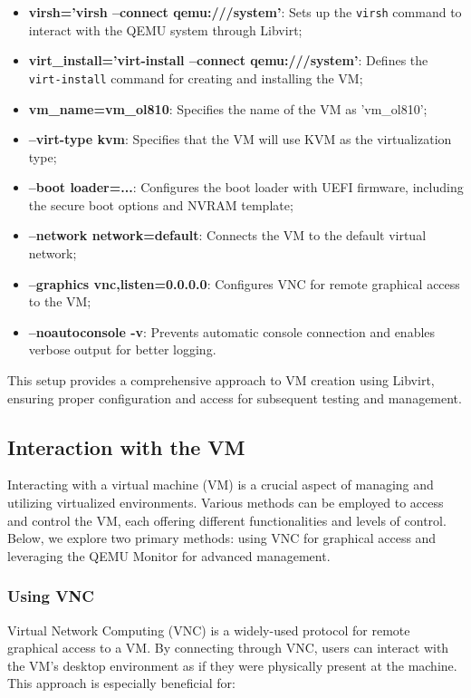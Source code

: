 \begin{itemize}
    \item \textbf{virsh='virsh --connect qemu:///system'}: Sets up the \texttt{virsh} command to interact with the QEMU system through Libvirt;
    \item \textbf{virt\_install='virt-install --connect qemu:///system'}: Defines the \texttt{virt-install} command for creating and installing the VM;
    \item \textbf{vm\_name=vm\_ol810}: Specifies the name of the VM as 'vm\_ol810';
    \item \textbf{--virt-type kvm}: Specifies that the VM will use KVM as the virtualization type;
    \item \textbf{--boot loader=...}: Configures the boot loader with UEFI firmware, including the secure boot options and NVRAM template;
    \item \textbf{--network network=default}: Connects the VM to the default virtual network;
    \item \textbf{--graphics vnc,listen=0.0.0.0}: Configures VNC for remote graphical access to the VM;
    \item \textbf{--noautoconsole -v}: Prevents automatic console connection and enables verbose output for better logging.
\end{itemize}

This setup provides a comprehensive approach to VM creation using Libvirt, ensuring proper configuration and access for subsequent testing and management.

\subsection{Interaction with the VM}

Interacting with a virtual machine (VM) is a crucial aspect of managing and utilizing virtualized environments. Various methods can be employed to access and control the VM, each offering different functionalities and levels of control. Below, we explore two primary methods: using VNC for graphical access and leveraging the QEMU Monitor for advanced management.

\subsubsection[Using VNC]{Using VNC}

Virtual Network Computing (VNC) is a widely-used protocol for remote graphical access to a VM. By connecting through VNC, users can interact with the VM's desktop environment as if they were physically present at the machine. This approach is especially beneficial for:

